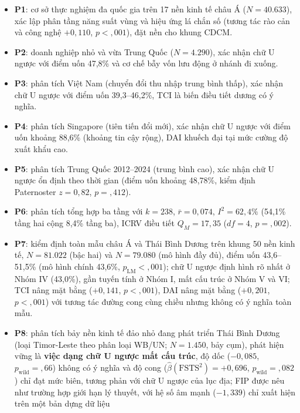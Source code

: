 \documentclass[
  a4paper,
  13pt]{extreport}
\begin{document}
\begin{itemize}
\item
  \textbf{P1}: cơ sở thực nghiệm đa quốc gia trên 17 nền kinh tế châu Á
  (\(N = 40.633\)), xác lập phân tầng năng suất vùng và hiệu ứng lá chắn
  số (tương tác rào cản và công nghệ \(+0{,}110\), \(p < {,}001\)), đặt
  nền cho khung CDCM.
\item
  \textbf{P2}: doanh nghiệp nhỏ và vừa Trung Quốc (\(N = 4.290\)), xác
  nhận chữ U ngược với điểm uốn 47,8\% và cơ chế bẫy vốn lưu động ở
  nhánh đi xuống.
\item
  \textbf{P3}: phân tích Việt Nam (chuyển đổi thu nhập trung bình thấp),
  xác nhận chữ U ngược với điểm uốn 39,3--46,2\%, TCI là biến điều tiết
  dương có ý nghĩa.
\item
  \textbf{P4}: phân tích Singapore (tiên tiến đổi mới), xác nhận chữ U
  ngược với điểm uốn khoảng 88,6\% (khoảng tin cậy rộng), DAI khuếch đại
  tại mức cường độ xuất khẩu cao.
\item
  \textbf{P5}: phân tích Trung Quốc 2012--2024 (trung bình cao), xác
  nhận chữ U ngược ổn định theo thời gian (điểm uốn khoảng 48,78\%, kiểm
  định Paternoster \(z = 0{,}82\), \(p = {,}412\)).
\item
  \textbf{P6}: phân tích tổng hợp ba tầng với \(k = 238\),
  \(\bar{r} = 0{,}074\), \(I^2 = 62{,}4\%\) (54,1\% tầng hai cộng 8,4\%
  tầng ba), ICRV điều tiết \(Q_M = 17{,}35\) (\(df = 4\),
  \(p = {,}002\)).
\item
  \textbf{P7}: kiểm định toàn mẫu châu Á và Thái Bình Dương trên khung
  50 nền kinh tế, \(N = 81.022\) (bậc hai) và \(N = 79.080\) (mô hình
  đầy đủ), điểm uốn 43,6--51,5\% (mô hình chính 43,6\%,
  \(p_\text{LM} < {,}001\)); chữ U ngược định hình rõ nhất ở Nhóm IV
  (43,0\%), gần tuyến tính ở Nhóm I, mất cấu trúc ở Nhóm V và VI; TCI
  nâng mặt bằng (\(+0{,}141\), \(p<{,}001\)), DAI nâng mặt bằng
  (\(+0{,}201\), \(p<{,}001\)) với tương tác đường cong cùng chiều nhưng
  không có ý nghĩa toàn mẫu.
\item
  \textbf{P8}: phân tích bảy nền kinh tế đảo nhỏ đang phát triển Thái
  Bình Dương (loại Timor-Leste theo phân loại WB/UN; \(N = 1.450\), bảy
  cụm), phát hiện vững là \textbf{việc dạng chữ U ngược mất cấu trúc},
  độ dốc (\(-0{,}085\), \(p_\text{wild} = {,}66\)) không có ý nghĩa và
  độ cong (\(\hat{\beta}(\text{FSTS}^2) = +0{,}696\),
  \(p_\text{wild} = {,}082\)) chỉ đạt mức biên, tương phản với chữ U
  ngược của lục địa; FIP được nêu như trường hợp giới hạn lý thuyết, với
  hệ số âm mạnh (\(-1{,}339\)) chỉ xuất hiện trên một bản dựng dữ liệu

\end{itemize}
\end{document}
